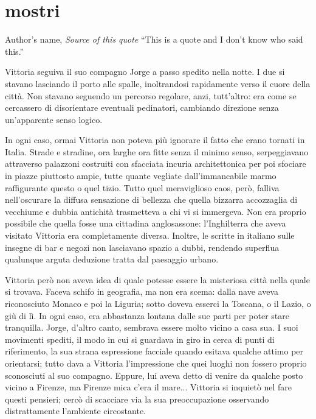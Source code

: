 \chapter{mostri}

\begin{chapquote}{Author's name, \textit{Source of this quote}}
``This is a quote and I don't know who said this.''
\end{chapquote}


Vittoria seguiva il suo compagno Jorge a passo spedito nella notte. I due si stavano lasciando il porto alle spalle, inoltrandosi rapidamente verso il cuore della città. Non stavano seguendo un percorso regolare, anzi, tutt'altro: era come se cercassero di disorientare eventuali pedinatori, cambiando direzione senza un'apparente senso logico.

In ogni caso, ormai Vittoria non poteva più ignorare il fatto che erano tornati in Italia. Strade e stradine, ora larghe ora fitte senza il minimo senso, serpeggiavano attraverso palazzoni costruiti con sfacciata incuria architettonica per poi sfociare in piazze piuttosto ampie, tutte quante vegliate dall'immancabile marmo raffigurante questo o quel tizio. Tutto quel meraviglioso caos, però, falliva nell'oscurare la diffusa sensazione di bellezza che quella bizzarra accozzaglia di vecchiume e dubbia antichità trasmetteva a chi vi si immergeva. Non era proprio possibile che quella fosse una cittadina anglosassone: l'Inghilterra che aveva visitato Vittoria era completamente diversa. Inoltre, le scritte in italiano sulle insegne di bar e negozi non lasciavano spazio a dubbi, rendendo superflua qualunque arguta deduzione tratta dal paesaggio urbano.

Vittoria però non aveva idea di quale potesse essere la misteriosa città nella quale si trovava. Faceva schifo in geografia, ma non era scema: dalla nave aveva riconosciuto Monaco e poi la Liguria; sotto doveva esserci la Toscana, o il Lazio, o giù di lì. In ogni caso, era abbastanza lontana dalle sue parti per poter stare tranquilla. Jorge, d'altro canto, sembrava essere molto vicino a casa sua. I suoi movimenti spediti, il modo in cui si guardava in giro in cerca di punti di riferimento, la sua strana espressione facciale quando esitava qualche attimo per orientarsi; tutto dava a Vittoria l'impressione che quei luoghi non fossero proprio sconosciuti al suo compagno. Eppure, lui aveva detto di venire da qualche posto vicino a Firenze, ma Firenze mica c'era il mare... Vittoria si inquietò nel fare questi pensieri; cercò di scacciare via la sua preoccupazione osservando distrattamente l'ambiente circostante.

